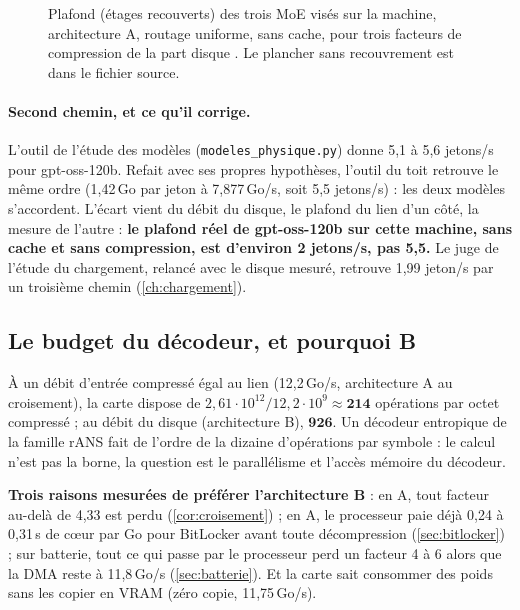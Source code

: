 \begin{figure}[ht]
\centering
\GrapheToitPlacements
\caption[Le toit des trois MoE visés, placement réel]{Plafond (étages recouverts) des trois MoE visés sur la machine, architecture A, routage uniforme, sans cache, pour trois facteurs de compression de la part disque \calc. Le plancher sans recouvrement est dans le fichier source.}
\label{fig:toit-placements}
\end{figure}

\paragraph{Second chemin, et ce qu'il corrige.} L'outil de l'étude des modèles (\texttt{modeles\_physique.py}) donne 5,1 à 5,6 jetons/s pour gpt-oss-120b. Refait avec ses propres hypothèses, l'outil du toit retrouve le même ordre (1,42\,Go par jeton à 7,877\,Go/s, soit 5,5 jetons/s) : les deux modèles s'accordent. L'écart vient du débit du disque, le plafond du lien d'un côté, la mesure de l'autre : \textbf{le plafond réel de gpt-oss-120b sur cette machine, sans cache et sans compression, est d'environ 2 jetons/s, pas 5,5.} Le juge de l'étude du chargement, relancé avec le disque mesuré, retrouve 1,99 jeton/s par un troisième chemin (\cref{ch:chargement}).

\subsection{Le budget du décodeur, et pourquoi B}

À un débit d'entrée compressé égal au lien (12,2\,Go/s, architecture A au croisement), la carte dispose de $2{,}61\cdot10^{12} / 12{,}2\cdot10^{9} \approx \mathbf{214}$ opérations par octet compressé \calc ; au débit du disque (architecture B), $\mathbf{926}$. Un décodeur entropique de la famille rANS fait de l'ordre de la dizaine d'opérations par symbole : le calcul n'est pas la borne, la question est le parallélisme et l'accès mémoire du décodeur.

\textbf{Trois raisons mesurées de préférer l'architecture B} : en A, tout facteur au-delà de 4,33 est perdu (\cref{cor:croisement}) ; en A, le processeur paie déjà 0,24 à 0,31\,s de cœur par Go pour BitLocker avant toute décompression (\cref{sec:bitlocker}) ; sur batterie, tout ce qui passe par le processeur perd un facteur 4 à 6 alors que la DMA reste à 11,8\,Go/s (\cref{sec:batterie}). Et la carte sait consommer des poids sans les copier en VRAM (zéro copie, 11,75\,Go/s).

